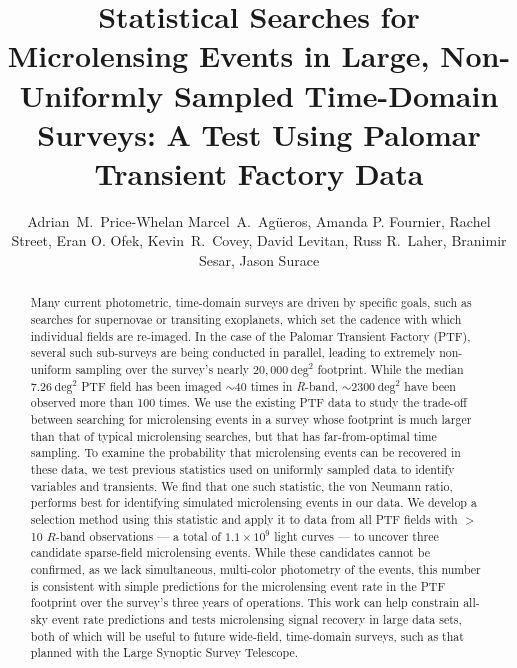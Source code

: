 \documentclass{emulateapj}
\begin{document}
\title{Statistical Searches for Microlensing Events in Large, Non-Uniformly Sampled Time-Domain Surveys: A Test Using Palomar Transient Factory Data}
\author{Adrian~M.~Price-Whelan Marcel~A.~Ag\"ueros, Amanda P. Fournier, Rachel Street, Eran O. Ofek, Kevin~R.~Covey, David Levitan, Russ R.~Laher, Branimir Sesar, Jason Surace}


\begin{abstract}
Many current photometric, time-domain surveys are driven by specific goals, such as searches for supernovae or transiting exoplanets, which set the cadence with which individual fields are re-imaged. In the case of the Palomar Transient Factory (PTF), several such sub-surveys are being conducted in parallel, leading to extremely non-uniform sampling over the survey's nearly $20,000~\mathrm{deg}^2$ footprint. While the median $7.26~\mathrm{deg}^2$ PTF field has been imaged $\sim$40 times in \textit{R}-band, $\sim$$2300~\mathrm{deg}^2$ have been observed more than 100 times. We use the existing PTF data to study the trade-off between searching for microlensing events in a survey whose footprint is much larger than that of typical microlensing searches, but that has far-from-optimal time sampling. To examine the probability that microlensing events can be recovered in these data, we test previous statistics used on uniformly sampled data to identify variables and transients. We find that one such statistic, the von Neumann ratio, performs best for identifying simulated microlensing events in our data. We develop a selection method using this statistic and apply it to data from all PTF fields with $>$10 $R$-band observations --- a total of $1.1\times10^9$ light curves --- to uncover three candidate sparse-field microlensing events. While these candidates cannot be confirmed, as we lack simultaneous, multi-color photometry of the events, this number is consistent with simple predictions for the microlensing event rate in the PTF footprint over the survey's three years of operations. This work can help constrain all-sky event rate predictions and tests microlensing signal recovery in large data sets, both of which will be useful to future wide-field, time-domain surveys, such as that planned with the Large Synoptic Survey Telescope. 
\end{abstract}
\end{document}
